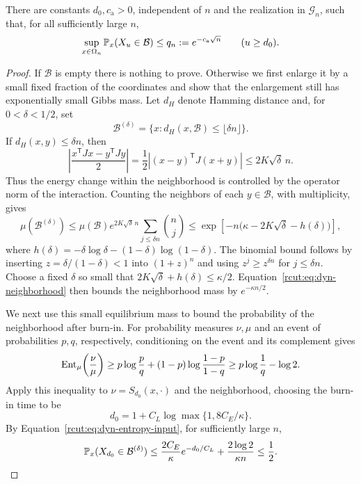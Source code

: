 \begin{proposition}
\label{rcut:prop:bad-avoidance}
There are constants $d_0,c_{\mathrm a}>0$, independent of $n$ and
the realization in $\mathcal G_n$, such that, for all sufficiently
large $n$,
\begin{equation}
 \sup_{x\in\Omega_n}\P_x(X_u\in\mathcal B)
 \le q_n:=e^{-c_{\mathrm a}\sqrt n}
 \qquad(u\ge d_0).
 \label{rcut:eq:dyn-bad-avoidance}
\end{equation}
\end{proposition}

\begin{proof}
If $\mathcal B$ is empty there is nothing to prove.  Otherwise we
first enlarge it by a small fixed fraction of the coordinates and show
that the enlargement still has exponentially small Gibbs mass.  Let
$d_H$ denote Hamming distance and, for $0<\delta<1/2$, set
\[
 \mathcal B^{(\delta)}
 =\{x:d_H(x,\mathcal B)\le\lfloor\delta n\rfloor\}.
\]
If $d_H(x,y)\le\delta n$, then
\[
 \left|\frac{x^{\mathsf T}Jx-y^{\mathsf T}Jy}{2}\right|
 =\frac12\left|(x-y)^{\mathsf T}J(x+y)\right|
 \le2K\sqrt\delta\,n.
\]
Thus the energy change within the neighborhood is controlled by the
operator norm of the interaction.  Counting the neighbors of each
$y\in\mathcal B$, with multiplicity, gives
\begin{equation}
 \mu(\mathcal B^{(\delta)})
 \le \mu(\mathcal B)e^{2K\sqrt\delta\,n}
       \sum_{j\le\delta n}\binom nj
 \le \exp\!\left[-n\bigl(\kappa-2K\sqrt\delta-h(\delta)\bigr)\right],
 \label{rcut:eq:dyn-neighborhood}
\end{equation}
where $h(\delta)=-\delta\log\delta-(1-\delta)\log(1-\delta)$.
The binomial bound follows by inserting
$z=\delta/(1-\delta)<1$ into $(1+z)^n$ and using
$z^j\ge z^{\delta n}$ for $j\le\delta n$.
Choose a fixed $\delta$ so small that
$2K\sqrt\delta+h(\delta)\le\kappa/2$.  Equation~\eqref{rcut:eq:dyn-neighborhood}
then bounds the neighborhood mass by $e^{-\kappa n/2}$.

We next use this small equilibrium mass to bound the probability of
the neighborhood after burn-in.  For probability measures $\nu,\mu$
and an event of probabilities $p,q$, respectively, conditioning on the
event and its complement gives
\[
 \Ent_\mu\!\left(\frac{\nu}{\mu}\right)
 \ge p\log\frac pq+(1-p)\log\frac{1-p}{1-q}
 \ge p\log\frac1q-\log2.
\]
Apply this inequality to $\nu=S_{d_0}(x,\cdot)$ and the neighborhood,
choosing the burn-in time to be
\[
 d_0=1+C_L\log\max\{1,8C_E/\kappa\}.
\]
By Equation~\eqref{rcut:eq:dyn-entropy-input}, for sufficiently large $n$,
\[
 \P_x(X_{d_0}\in\mathcal B^{(\delta)})
 \le\frac{2C_E}{\kappa}e^{-d_0/C_L}
       +\frac{2\log2}{\kappa n}
 \le\frac12.
\]


\end{proof}
